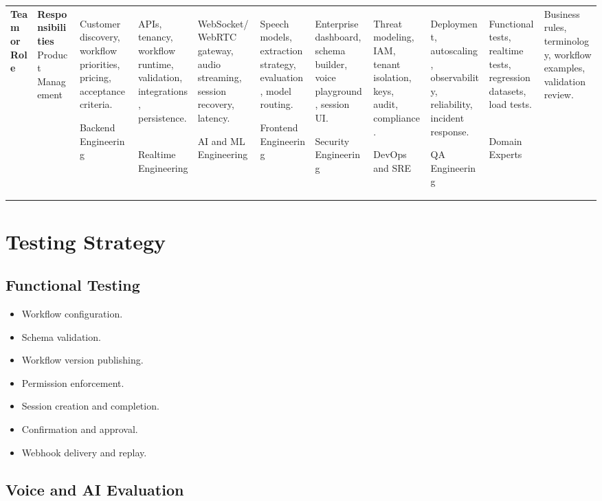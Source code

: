 \documentclass[11pt,a4paper]{article}
\begin{document}
\begin{tabularx}{\textwidth}{L{42mm}Y}
\toprule
\textbf{Team or Role} & \textbf{Responsibilities} \
\midrule
Product Management
& Customer discovery, workflow priorities, pricing, acceptance criteria. \

Backend Engineering
& APIs, tenancy, workflow runtime, validation, integrations, persistence. \

Realtime Engineering
& WebSocket/WebRTC gateway, audio streaming, session recovery, latency. \

AI and ML Engineering
& Speech models, extraction strategy, evaluation, model routing. \

Frontend Engineering
& Enterprise dashboard, schema builder, voice playground, session UI. \

Security Engineering
& Threat modeling, IAM, tenant isolation, keys, audit, compliance. \

DevOps and SRE
& Deployment, autoscaling, observability, reliability, incident response. \

QA Engineering
& Functional tests, realtime tests, regression datasets, load tests. \

Domain Experts
& Business rules, terminology, workflow examples, validation review. \
\bottomrule
\end{tabularx}

\section{Testing Strategy}

\subsection{Functional Testing}

\begin{itemize}
\item Workflow configuration.
\item Schema validation.
\item Workflow version publishing.
\item Permission enforcement.
\item Session creation and completion.
\item Confirmation and approval.
\item Webhook delivery and replay.
\end{itemize}

\subsection{Voice and AI Evaluation}
\end{document}
